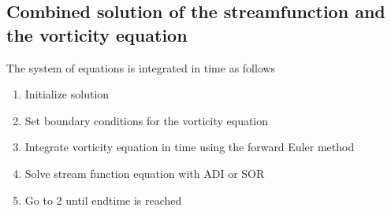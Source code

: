 \subsection{Combined solution of the streamfunction and the vorticity equation}
The system of equations is integrated in time as follows
\begin{enumerate}
\item{Initialize solution}
\item{Set boundary conditions for the vorticity equation}
\item{Integrate vorticity equation in time using the forward Euler method}
\item{Solve stream function equation with ADI or SOR}
\item{Go to 2 until endtime is reached}
\end{enumerate}